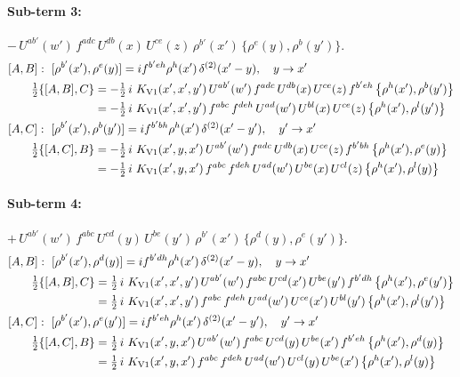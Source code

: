 \documentclass[10pt]{article}
\numberwithin{equation}{section}
\begin{document}
\paragraph{Sub-term 3:} $-\,U^{ab'}(w')\,f^{adc}\,U^{db}(x)\,U^{ce}(z)\,\rho^{b'}(x')\,\big\{\rho^{e}(y),\rho^{b}(y')\big\}$.
\begin{align}
&[A,B]:\ [\rho^{b'}(x'),\rho^{e}(y)]=i f^{b'eh}\rho^{h}(x')\,\delta^{(2)}(x'-y),\quad y\to x'\notag\\
&\qquad \tfrac12\{[A,B],C\}=-\tfrac12\,i\,\,K_{\rm V1}(x',x',y')\,U^{ab'}(w')\,f^{adc}\,U^{db}(x)\,U^{ce}(z)\,f^{b'eh}\,\big\{\rho^{h}(x'),\rho^{b}(y')\big\}\notag\\
&\qquad\phantom{\tfrac12\{[A,B],C\}}=-\tfrac12\,i\,\,K_{\rm V1}(x',x',y')\,f^{abc}\,f^{deh}\,U^{ad}(w')\,U^{bl}(x)\,U^{ce}(z)\,\big\{\rho^{h}(x'),\rho^{l}(y')\big\}
\label{eq:GI.V1-3-AB}\\
&[A,C]:\ [\rho^{b'}(x'),\rho^{b}(y')]=i f^{b'bh}\rho^{h}(x')\,\delta^{(2)}(x'-y'),\quad y'\to x'\notag\\
&\qquad \tfrac12\{[A,C],B\}=-\tfrac12\,i\,\,K_{\rm V1}(x',y,x')\,U^{ab'}(w')\,f^{adc}\,U^{db}(x)\,U^{ce}(z)\,f^{b'bh}\,\big\{\rho^{h}(x'),\rho^{e}(y)\big\}\notag\\
&\qquad\phantom{\tfrac12\{[A,C],B\}}=-\tfrac12\,i\,\,K_{\rm V1}(x',y,x')\,f^{abc}\,f^{deh}\,U^{ad}(w')\,U^{be}(x)\,U^{cl}(z)\,\big\{\rho^{h}(x'),\rho^{l}(y)\big\}
\label{eq:GI.V1-3-AC}
\end{align}
\paragraph{Sub-term 4:} $+\,U^{ab'}(w')\,f^{abc}\,U^{cd}(y)\,U^{be}(y')\,\rho^{b'}(x')\,\big\{\rho^{d}(y),\rho^{e}(y')\big\}$.
\begin{align}
&[A,B]:\ [\rho^{b'}(x'),\rho^{d}(y)]=i f^{b'dh}\rho^{h}(x')\,\delta^{(2)}(x'-y),\quad y\to x'\notag\\
&\qquad \tfrac12\{[A,B],C\}=\tfrac12\,i\,\,K_{\rm V1}(x',x',y')\,U^{ab'}(w')\,f^{abc}\,U^{cd}(x')\,U^{be}(y')\,f^{b'dh}\,\big\{\rho^{h}(x'),\rho^{e}(y')\big\}\notag\\
&\qquad\phantom{\tfrac12\{[A,B],C\}}=\tfrac12\,i\,\,K_{\rm V1}(x',x',y')\,f^{abc}\,f^{deh}\,U^{ad}(w')\,U^{ce}(x')\,U^{bl}(y')\,\big\{\rho^{h}(x'),\rho^{l}(y')\big\}
\label{eq:GI.V1-4-AB}\\
&[A,C]:\ [\rho^{b'}(x'),\rho^{e}(y')]=i f^{b'eh}\rho^{h}(x')\,\delta^{(2)}(x'-y'),\quad y'\to x'\notag\\
&\qquad \tfrac12\{[A,C],B\}=\tfrac12\,i\,\,K_{\rm V1}(x',y,x')\,U^{ab'}(w')\,f^{abc}\,U^{cd}(y)\,U^{be}(x')\,f^{b'eh}\,\big\{\rho^{h}(x'),\rho^{d}(y)\big\}\notag\\
&\qquad\phantom{\tfrac12\{[A,C],B\}}=\tfrac12\,i\,\,K_{\rm V1}(x',y,x')\,f^{abc}\,f^{deh}\,U^{ad}(w')\,U^{cl}(y)\,U^{be}(x')\,\big\{\rho^{h}(x'),\rho^{l}(y)\big\}
\label{eq:GI.V1-4-AC}
\end{align}
\end{document}

